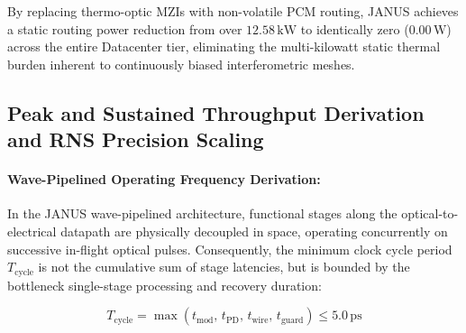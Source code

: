 \documentclass[journal]{IEEEtran}
\begin{document}
By replacing thermo-optic MZIs with non-volatile PCM routing, JANUS achieves a static routing power reduction from over $12.58\,\mathrm{kW}$ to identically zero ($0.00\,\mathrm{W}$) across the entire Datacenter tier, eliminating the multi-kilowatt static thermal burden inherent to continuously biased interferometric meshes.

\subsection{\textbf{Peak and Sustained Throughput Derivation and RNS Precision Scaling}}
\label{sec:operating_frequency}

\paragraph{\textbf{Wave-Pipelined Operating Frequency Derivation:}}

In the JANUS wave-pipelined architecture, functional stages along the optical-to-electrical datapath are physically decoupled in space, operating concurrently on successive in-flight optical pulses. Consequently, the minimum clock cycle period $T_{\text{cycle}}$ is not the cumulative sum of stage latencies, but is bounded by the bottleneck single-stage processing and recovery duration:

\begin{equation}
T_{\text{cycle}} = \max\left( t_{\text{mod}}, \, t_{\text{PD}}, \, t_{\text{wire}}, \, t_{\text{guard}} \right) \le 5.0\,\text{ps}
\end{equation}
\end{document}
